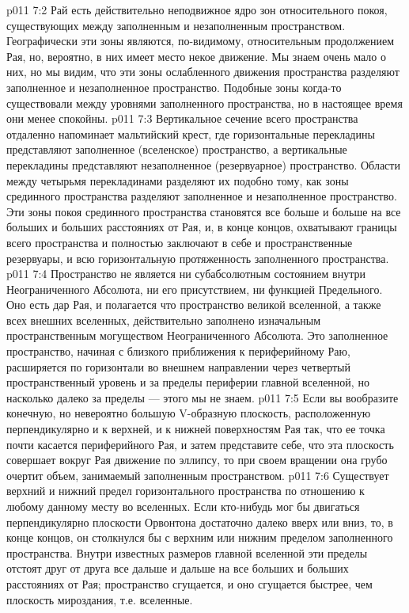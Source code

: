 \vs p011 7:2 Рай есть действительно неподвижное ядро зон относительного покоя, существующих между заполненным и незаполненным пространством. Географически эти зоны являются, по\hyp{}видимому, относительным продолжением Рая, но, вероятно, в них имеет место некое движение. Мы знаем очень мало о них, но мы видим, что эти зоны ослабленного движения пространства разделяют заполненное и незаполненное пространство. Подобные зоны когда\hyp{}то существовали между уровнями заполненного пространства, но в настоящее время они менее спокойны.
\vs p011 7:3 Вертикальное сечение всего пространства отдаленно напоминает мальтийский крест, где горизонтальные перекладины представляют заполненное (вселенское) пространство, а вертикальные перекладины представляют незаполненное (резервуарное) пространство. Области между четырьмя перекладинами разделяют их подобно тому, как зоны срединного пространства разделяют заполненное и незаполненное пространство. Эти зоны покоя срединного пространства становятся все больше и больше на все больших и больших расстояниях от Рая, и, в конце концов, охватывают границы всего пространства и полностью заключают в себе и пространственные резервуары, и всю горизонтальную протяженность заполненного пространства.
\vs p011 7:4 \pc Пространство не является ни субабсолютным состоянием внутри Неограниченного Абсолюта, ни его присутствием, ни функцией Предельного. Оно есть дар Рая, и полагается что пространство великой вселенной, а также всех внешних вселенных, действительно заполнено изначальным пространственным могуществом Неограниченного Абсолюта. Это заполненное пространство, начиная с близкого приближения к периферийному Раю, расширяется по горизонтали во внешнем направлении через четвертый пространственный уровень и за пределы периферии главной вселенной, но насколько далеко за пределы --- этого мы не знаем.
\vs p011 7:5 Если вы вообразите конечную, но невероятно большую V\hyp{}образную плоскость, расположенную перпендикулярно и к верхней, и к нижней поверхностям Рая так, что ее точка почти касается периферийного Рая, и затем представите себе, что эта плоскость совершает вокруг Рая движение по эллипсу, то при своем вращении она грубо очертит объем, занимаемый заполненным пространством.
\vs p011 7:6 Существует верхний и нижний предел горизонтального пространства по отношению к любому данному месту во вселенных. Если кто\hyp{}нибудь мог бы двигаться перпендикулярно плоскости Орвонтона достаточно далеко вверх или вниз, то, в конце концов, он столкнулся бы с верхним или нижним пределом заполненного пространства. Внутри известных размеров главной вселенной эти пределы отстоят друг от друга все дальше и дальше на все больших и больших расстояниях от Рая; пространство сгущается, и оно сгущается быстрее, чем плоскость мироздания, т.е. вселенные.
